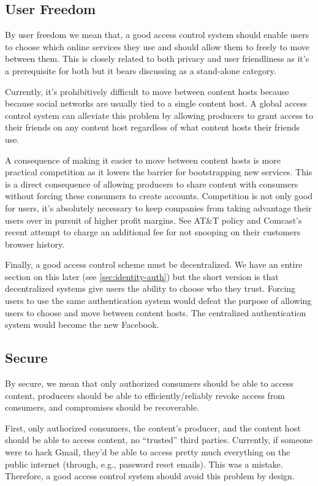 \documentclass[pdftex,12pt,a4papaer,twoside,notitlepage]{report}
\begin{document}
\subsection{User Freedom}
\label{sec:goal-freedom}

By user freedom we mean that, a good access control system should enable users
to choose which online services they use and should allow them to freely to move
between them. This is closely related to both privacy and user friendliness as
it's a prerequisite for both but it bears discussing as a stand-alone category.

Currently, it's prohibitively difficult to move between content hosts because
because social networks are usually tied to a single content host. A global
access control system can alleviate this problem by allowing producers to grant
access to their friends on any content host regardless of what content hosts
their friends use.

A consequence of making it easier to move between content hosts is more
practical competition as it lowers the barrier for bootstrapping new services.
This is a direct consequence of allowing producers to share content with
consumers without forcing these consumers to create accounts. Competition is not
only good for users, it's absolutely necessary to keep companies from taking
advantage their users over in pursuit of higher profit margins. See
AT\&T\cite{att} policy and Comcast's\cite{comcast} recent attempt to charge an
additional fee for not snooping on their customers browser history.

Finally, a good access control scheme must be decentralized. We have an entire
section on this later (see \cref{sec:identity-auth}) but the short version is
that decentralized systems give users the ability to choose who they trust.
Forcing users to use the same authentication system would defeat the purpose of
allowing users to choose and move between content hosts. The centralized
authentication system would become the new Facebook.

\subsection{Secure}

By secure, we mean that only authorized consumers should be able to access
content, producers should be able to efficiently/reliably revoke access from
consumers, and compromises should be recoverable.

First, only authorized consumers, the content's producer, and the content host
should be able to access content, no ``trusted'' third parties. Currently, if
someone were to hack Gmail, they'd be able to access pretty much everything on
the public internet (through, e.g., password reset emails). This was a mistake.
Therefore, a good access control system should avoid this problem by design.
\end{document}
